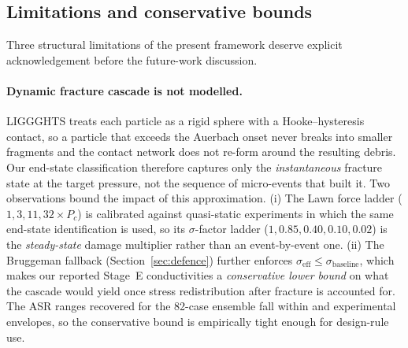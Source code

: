 \documentclass[11pt, a4paper]{article}
\begin{document}
\subsection{Limitations and conservative bounds}
\label{sec:limitations}
Three structural limitations of the present framework deserve
explicit acknowledgement before the future-work discussion.

\paragraph{Dynamic fracture cascade is not modelled.}
LIGGGHTS treats each particle as a rigid sphere with a
Hooke--hysteresis contact, so a particle that exceeds the
Auerbach onset never breaks into smaller fragments and the contact
network does not re-form around the resulting debris. Our
end-state classification therefore captures only the
\emph{instantaneous} fracture state at the target pressure, not the
sequence of micro-events that built it. Two observations bound the
impact of this approximation. (i) The Lawn force ladder
($1, 3, 11, 32 \times P_c$) is calibrated against
quasi-static experiments in which the same end-state
identification is used, so its $\sigma$-factor ladder
($1, 0.85, 0.40, 0.10, 0.02$) is the \emph{steady-state} damage
multiplier rather than an event-by-event one. (ii) The Bruggeman
fallback (Section~\ref{sec:defence}) further enforces
$\sigma_{\mathrm{eff}} \le \sigma_{\mathrm{baseline}}$, which makes
our reported Stage~E conductivities a \emph{conservative lower
bound} on what the cascade would yield once stress
redistribution after fracture is accounted for. The ASR ranges
recovered for the 82-case ensemble fall within
\citet{Bielefeld2022} and \citet{Lee2020} experimental envelopes,
so the conservative bound is empirically tight enough for
design-rule use.
\end{document}
